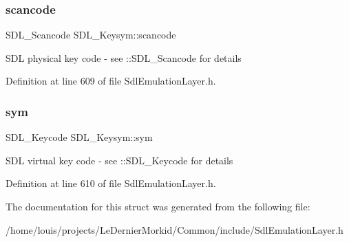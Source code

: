 \mbox{\label{struct_s_d_l___keysym_ad47e9120a511e2efc7ec0c6d8a5ec51e}} 
\subsubsection{\texorpdfstring{scancode}{scancode}}
{\footnotesize\ttfamily S\+D\+L\+\_\+\+Scancode S\+D\+L\+\_\+\+Keysym\+::scancode}

S\+DL physical key code -\/ see \+::\+S\+D\+L\+\_\+\+Scancode for details 

Definition at line 609 of file Sdl\+Emulation\+Layer.\+h.

\mbox{\label{struct_s_d_l___keysym_a082ff1fd787b79fa6c3a445deb225f08}} 
\subsubsection{\texorpdfstring{sym}{sym}}
{\footnotesize\ttfamily S\+D\+L\+\_\+\+Keycode S\+D\+L\+\_\+\+Keysym\+::sym}

S\+DL virtual key code -\/ see \+::\+S\+D\+L\+\_\+\+Keycode for details 

Definition at line 610 of file Sdl\+Emulation\+Layer.\+h.



The documentation for this struct was generated from the following file\+:\begin{DoxyCompactItemize}
\item 
/home/louis/projects/\+Le\+Dernier\+Morkid/\+Common/include/Sdl\+Emulation\+Layer.\+h\end{DoxyCompactItemize}
